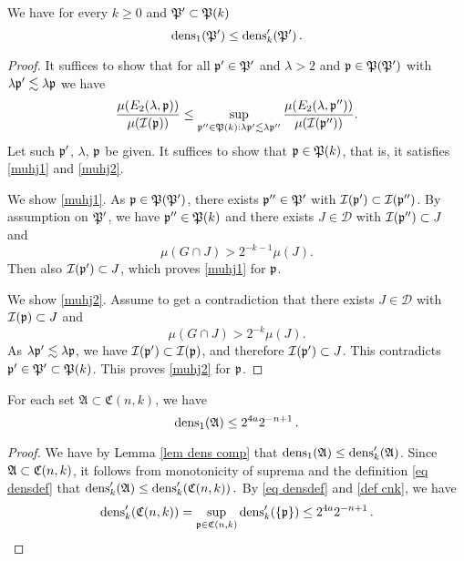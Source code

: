 \begin{lemma}
    \label{lem dens comp}
    We have for every $k\ge 0$ and $\mathfrak P'\subset \mathfrak P(k)$
\begin{equation}
    \operatorname{\operatorname{dens}}_1(\mathfrak P')\le \operatorname{\operatorname{dens}}_k'(\mathfrak P')\, .
\end{equation}
\end{lemma}
\begin{proof}
It suffices to show that for all $\mathfrak p'\in \mathfrak P'$
and  $\lambda>2$ and  $\mathfrak p\in \mathfrak P(\mathfrak P')$ with $\lambda \mathfrak p' \lesssim \lambda \mathfrak p$ we have
\begin{equation}
    \frac{\mu({E}_2(\lambda, \mathfrak p))}{\mu(\mathcal{I}(\mathfrak p))}
    \le \sup_{\mathfrak p'' \in \mathfrak P(k): \lambda \mathfrak p' \lesssim \lambda \mathfrak p''}
    \frac{\mu({E}_2(\lambda, \mathfrak p''))}{\mu(\mathcal{I}(\mathfrak p''))}.
\end{equation}
    Let such $\mathfrak p'$, $\lambda$, $\mathfrak p$ be given.
    It suffices to show that $\mathfrak p\in \mathfrak P(k)$,
    that is, it satisfies \eqref{muhj1}
    and \eqref{muhj2}.

We show \eqref{muhj1}.
    As $\mathfrak p\in \mathfrak P(\mathfrak P')$, there exists
$\mathfrak p''\in \mathfrak P'$ with $\mathcal{I}(\mathfrak p')\subset \mathcal{I}(\mathfrak p'')$. By assumption on $\mathfrak P'$, we have  $\mathfrak p''\in \mathfrak P(k)$ and there exists
$J\in \mathcal{D}$ with
    $\mathcal{I}(\mathfrak p'')\subset J$ and
    \begin{equation}
        \mu(G\cap J)>2^{-k-1} \mu(J).
    \end{equation}
Then also $\mathcal{I}(\mathfrak p')\subset J$, which proves
\eqref{muhj1} for $\mathfrak p$.

We show \eqref{muhj2}. Assume to get a contradiction that
there exists $J\in \mathcal{D}$ with
    $\mathcal{I}(\mathfrak p)\subset J$ and
    \begin{equation}\label{mugj}
        \mu(G\cap J)>2^{-k} \mu(J).
    \end{equation}
    As $\lambda\mathfrak p'\lesssim \lambda\mathfrak p$, we have $\mathcal{I}(\mathfrak p')\subset \mathcal{I}(\mathfrak p)$, and therefore
    $\mathcal{I}(\mathfrak p')\subset J$. This contradicts
    $\mathfrak p'\in \mathfrak P'\subset \mathfrak P(k)$. This proves
\eqref{muhj2} for $\mathfrak p$.
\end{proof}

\begin{lemma}
    \label{lem 1density}
    For each set $\mathfrak{A} \subset \mathfrak{C}(n,k)$, we have
    $$
        \operatorname{\operatorname{dens}}_1(\mathfrak{A}) \le 2^{4a}2^{-n+1}\,.
    $$
\end{lemma}

\begin{proof}
    We have by Lemma \ref{lem dens comp} that
    $\operatorname{\operatorname{dens}}_1(\mathfrak{A}) \le \operatorname{\operatorname{dens}}_k'(\mathfrak{A})$. Since $\mathfrak{A} \subset \mathfrak C(n,k)$, it follows from monotonicity of suprema and the definition \eqref{eq densdef} that
    $
        \operatorname{\operatorname{dens}}_k'(\mathfrak{A}) \le \operatorname{\operatorname{dens}}_k'(\mathfrak C(n,k))\,.
    $
    By \eqref{eq densdef} and \eqref{def cnk}, we have
    $$
        \operatorname{\operatorname{dens}}_k'(\mathfrak C(n,k)) = \sup_{\mathfrak p \in \mathfrak C(n,k)} \operatorname{\operatorname{dens}}_k'(\{\mathfrak p\}) \le 2^{4a}2^{-n+1}\,.
    $$
\end{proof}


